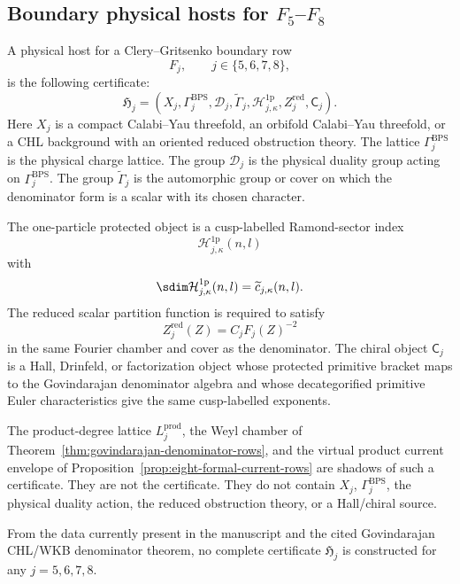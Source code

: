 \subsection{\texorpdfstring{Boundary physical hosts for \(F_5\)--\(F_8\)}
{Boundary physical hosts for F5-F8}}

\begin{definition}
A physical host for a Clery--Gritsenko boundary row
\[
F_j,\qquad j\in\{5,6,7,8\},
\]
is the following certificate:
\[
\mathfrak H_j=
\left(
X_j,\Gamma_j^{\mathrm{BPS}},\mathscr D_j,
\widetilde{\Gamma}_j,\mathcal H_{j,\kappa}^{1\mathrm p},
Z_j^{\mathrm{red}},\mathsf C_j
\right).
\]
Here \(X_j\) is a compact Calabi--Yau threefold, an orbifold
Calabi--Yau threefold, or a CHL background with an oriented reduced
obstruction theory.  The lattice \(\Gamma_j^{\mathrm{BPS}}\) is the
physical charge lattice.  The group \(\mathscr D_j\) is the physical
duality group acting on \(\Gamma_j^{\mathrm{BPS}}\).  The group
\(\widetilde{\Gamma}_j\) is the automorphic group or cover on which the
denominator form is a scalar with its chosen character.

The one-particle protected object is a cusp-labelled Ramond-sector
index
\[
\mathcal H_{j,\kappa}^{1\mathrm p}(n,l)
\]
with
\[
\sdim\mathcal H_{j,\kappa}^{1\mathrm p}(n,l)
=\widetilde c_{j,\kappa}(n,l).
\]
The reduced scalar partition function is required to satisfy
\[
Z_j^{\mathrm{red}}(Z)=C_jF_j(Z)^{-2}
\]
in the same Fourier chamber and cover as the denominator.  The chiral
object \(\mathsf C_j\) is a Hall, Drinfeld, or factorization object whose
protected primitive bracket maps to the Govindarajan denominator algebra
and whose decategorified primitive Euler characteristics give the same
cusp-labelled exponents.
\end{definition}

\begin{remark}
The product-degree lattice \(L_j^{\mathrm{prod}}\), the Weyl chamber of
Theorem~\ref{thm:govindarajan-denominator-rows}, and the virtual
product current envelope of Proposition~\ref{prop:eight-formal-current-rows}
are shadows of such a certificate.  They are not the certificate.  They
do not contain \(X_j\), \(\Gamma_j^{\mathrm{BPS}}\), the physical duality
action, the reduced obstruction theory, or a Hall/chiral source.
\end{remark}

\begin{theorem}[Current no-go]
From the data currently present in the manuscript and the cited
Govindarajan CHL/WKB denominator theorem, no complete certificate
\(\mathfrak H_j\) is constructed for any \(j=5,6,7,8\).
\end{theorem}

